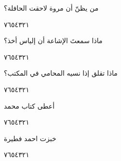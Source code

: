 \documentclass[11pt, a4paper]{article}
\begin{document}
{\vspace{0.5\baselineskip}\begin{flushright}
\textarabic{من يظنّ أن مروة لاحقت الحافلة؟}
\end{flushright}

\begin{center}
        \hfill\textarabic{٧}\hfill\textarabic{٦}\hfill\textarabic{٥}\hfill\textarabic{٤}\hfill\textarabic{٣}\hfill\textarabic{٢}\hfill\textarabic{١}
        \end{center}


\vspace{0.5\baselineskip}\begin{flushright}
\textarabic{ماذا سمعتَ الإشاعة أن إلياس أخذ؟}
\end{flushright}

\begin{center}
        \hfill\textarabic{٧}\hfill\textarabic{٦}\hfill\textarabic{٥}\hfill\textarabic{٤}\hfill\textarabic{٣}\hfill\textarabic{٢}\hfill\textarabic{١}
        \end{center}


\vspace{0.5\baselineskip}\begin{flushright}
\textarabic{ماذا تقلق إذا نسيه المحامي في المكتب؟}
\end{flushright}

\begin{center}
        \hfill\textarabic{٧}\hfill\textarabic{٦}\hfill\textarabic{٥}\hfill\textarabic{٤}\hfill\textarabic{٣}\hfill\textarabic{٢}\hfill\textarabic{١}
        \end{center}


\vspace{0.5\baselineskip}\begin{flushright}
\textarabic{أعطى كتاب محمد}
\end{flushright}

\begin{center}
        \hfill\textarabic{٧}\hfill\textarabic{٦}\hfill\textarabic{٥}\hfill\textarabic{٤}\hfill\textarabic{٣}\hfill\textarabic{٢}\hfill\textarabic{١}
        \end{center}


\vspace{0.5\baselineskip}\begin{flushright}
\textarabic{خبزت احمد فطيرة}
\end{flushright}

\begin{center}
        \hfill\textarabic{٧}\hfill\textarabic{٦}\hfill\textarabic{٥}\hfill\textarabic{٤}\hfill\textarabic{٣}\hfill\textarabic{٢}\hfill\textarabic{١}
        \end{center}
		
}
\end{document}
